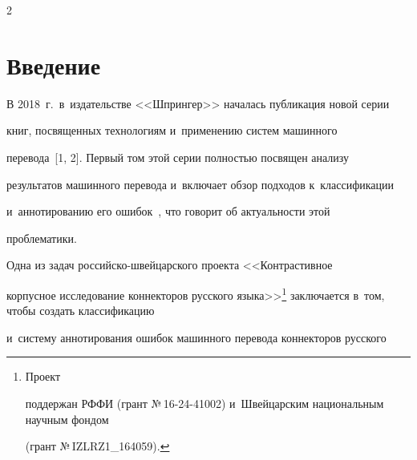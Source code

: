 

  


\vspace*{-6pt}













\thispagestyle{headings}





\begin{multicols}{2}





\label{st\stat}





\section{Введение}





  В 2018~г.\ в~издательстве <<Шпрингер>> началась публикация новой серии 


книг, посвященных технологиям и~применению систем машинного 


перевода~[1, 2]. Первый том этой серии полностью посвящен анализу 


результатов машинного перевода и~включает обзор подходов к~классификации 


и~аннотированию его ошибок~\cite{3-gz}, что говорит об актуальности этой 


проблематики.


  


  Одна из задач рос\-сий\-ско-швей\-цар\-ско\-го проекта <<Контрастивное 


корпусное исследование коннекторов русского языка>>\footnote[5]{Проект 


поддержан РФФИ (грант №\,16-24-41002) и~Швейцарским национальным научным фондом 


(грант №\,IZLRZ1\_164059).} заключается в~том, чтобы создать классификацию 


и~систему аннотирования ошибок машинного перевода коннекторов русского 



\end{multicols}
